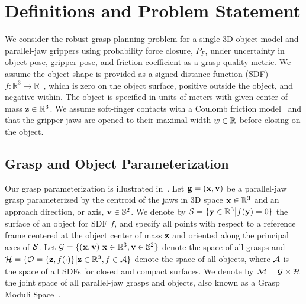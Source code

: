 \section{Definitions and Problem Statement}

We consider the robust grasp planning problem for a single 3D object model and parallel-jaw grippers using probability force closure, $P_F$,  under uncertainty in object pose, gripper pose, and friction coefficient as a grasp quality metric.
We assume the object shape is provided as a signed distance function (SDF) $f: \mathbb{R}^3 \rightarrow \mathbb{R}$~\cite{mahler2015gp}, which is zero on the object surface, positive outside the object, and negative within. 
The object is specified in units of meters with given center of mass $\mathbf{z} \in \mathbb{R}^3$.
We assume soft-finger contacts with a Coulomb friction model~\cite{zheng2005} and that the gripper jaws are opened to their maximal width $w \in\mathbb{R}$ before closing on the object.

\subsection{Grasp and Object Parameterization}
Our grasp parameterization is illustrated in~.
Let $\mathbf{g} = (\mathbf{x}, \mathbf{v})$ be a parallel-jaw grasp parameterized by the centroid of the jaws in 3D space $\mathbf{x} \in \mathbb{R}^3$ and an approach direction, or axis, $\mathbf{v} \in \mathbb{S}^2$.
We denote by $\mathcal{S} = \{\mathbf{y} \in \mathbb{R}^3 \big| f(\mathbf{y}) = 0\}$ the surface of an object for SDF $f$, and specify all points with respect to a reference frame centered at the object center of mass $\mathbf{z}$ and oriented along the principal axes of $\mathcal{S}$.
Let $\mathcal{G} = \{ (\mathbf{x}, \mathbf{v}) \big| \mathbf{x} \in \mathbb{R}^3, \mathbf{v} \in \mathbb{S}^2\}$ denote the space of all grasps and $\mathcal{H} = \{ \mathcal{O} = \{\mathbf{z}, f(\cdot)\} \big|  \mathbf{z} \in \mathbb{R}^3, f \in \mathcal{A}\}$ denote the space of all objects, where $\mathcal{A}$ is the space of all SDFs for closed and compact surfaces.
We denote by $\mathcal{M} = \mathcal{G} \times \mathcal{H}$ the joint space of all parallel-jaw grasps and objects, also known as a Grasp Moduli Space~\cite{pokorny2013grasp}.

